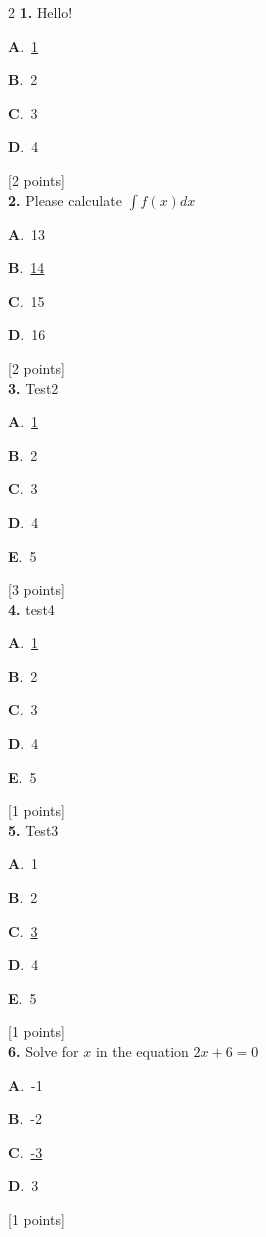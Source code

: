 \documentclass[12pt]{article}
\newcommand{\choice}[3]{%
  \noindent\textbf{#1}.~#2\hfill#3\par\vspace{0.25em}
}
\begin{document}
\begin{multicols}{2}
\noindent \textbf{\textenglish{1.}} {\textenglish{Hello!}}

\noindent\choice{A}{\underline{{\textenglish{1}}}}{}
\noindent\choice{B}{{\textenglish{2}}}{}
\noindent\choice{C}{{\textenglish{3}}}{}
\noindent\choice{D}{{\textenglish{4}}}{}
\hfill {\textenglish{[2 points]}}\\[0.5em]

\noindent \textbf{\textenglish{2.}} {\textenglish{Please calculate }}\(\int f(x)dx\)

\noindent\choice{A}{{\textenglish{13}}}{}
\noindent\choice{B}{\underline{{\textenglish{14}}}}{}
\noindent\choice{C}{{\textenglish{15}}}{}
\noindent\choice{D}{{\textenglish{16}}}{}
\hfill {\textenglish{[2 points]}}\\[0.5em]

\noindent \textbf{\textenglish{3.}} {\textenglish{Test2}}

\noindent\choice{A}{\underline{{\textenglish{1}}}}{}
\noindent\choice{B}{{\textenglish{2}}}{}
\noindent\choice{C}{{\textenglish{3}}}{}
\noindent\choice{D}{{\textenglish{4}}}{}
\noindent\choice{E}{{\textenglish{5}}}{}
\hfill {\textenglish{[3 points]}}\\[0.5em]

\noindent \textbf{\textenglish{4.}} {\textenglish{test4}}

\noindent\choice{A}{\underline{{\textenglish{1}}}}{}
\noindent\choice{B}{{\textenglish{2}}}{}
\noindent\choice{C}{{\textenglish{3}}}{}
\noindent\choice{D}{{\textenglish{4}}}{}
\noindent\choice{E}{{\textenglish{5}}}{}
\hfill {\textenglish{[1 points]}}\\[0.5em]

\noindent \textbf{\textenglish{5.}} {\textenglish{Test3}}

\noindent\choice{A}{{\textenglish{1}}}{}
\noindent\choice{B}{{\textenglish{2}}}{}
\noindent\choice{C}{\underline{{\textenglish{3}}}}{}
\noindent\choice{D}{{\textenglish{4}}}{}
\noindent\choice{E}{{\textenglish{5}}}{}
\hfill {\textenglish{[1 points]}}\\[0.5em]

\noindent \textbf{\textenglish{6.}} {\textenglish{Solve for }}\(x \){\textenglish{ in the equation }}\(2x+6 = 0 \)

\noindent\choice{A}{{\textenglish{-1}}}{}
\noindent\choice{B}{{\textenglish{-2}}}{}
\noindent\choice{C}{\underline{{\textenglish{-3}}}}{}
\noindent\choice{D}{{\textenglish{3}}}{}
\hfill {\textenglish{[1 points]}}\\[0.5em]


\end{multicols}
\end{document}
